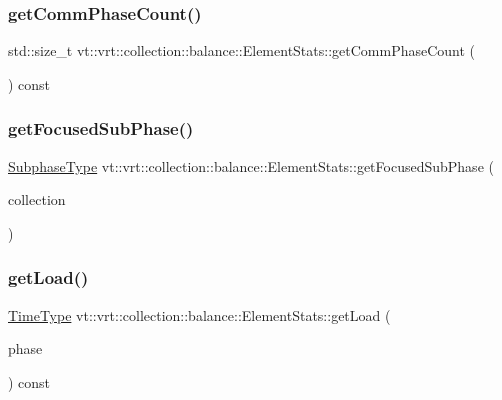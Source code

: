 \subsubsection{\texorpdfstring{get\+Comm\+Phase\+Count()}{getCommPhaseCount()}}
{\footnotesize\ttfamily std\+::size\+\_\+t vt\+::vrt\+::collection\+::balance\+::\+Element\+Stats\+::get\+Comm\+Phase\+Count (\begin{DoxyParamCaption}{ }\end{DoxyParamCaption}) const}

\mbox{\label{structvt_1_1vrt_1_1collection_1_1balance_1_1_element_stats_ac52b9e7f8ba66cc20e8130fa1e037e07}} 
\subsubsection{\texorpdfstring{get\+Focused\+Sub\+Phase()}{getFocusedSubPhase()}}
{\footnotesize\ttfamily \hyperlink{namespacevt_ae78cbfdf1e57470e33eedb074f2beeba}{Subphase\+Type} vt\+::vrt\+::collection\+::balance\+::\+Element\+Stats\+::get\+Focused\+Sub\+Phase (\begin{DoxyParamCaption}\item[{\hyperlink{namespacevt_a1b417dd5d684f045bb58a0ede70045ac}{Virtual\+Proxy\+Type}}]{collection }\end{DoxyParamCaption})\hspace{0.3cm}{\ttfamily [static]}}

\mbox{\label{structvt_1_1vrt_1_1collection_1_1balance_1_1_element_stats_aeb819ff1258eda6a7a1ccbd51b256731}} 
\subsubsection{\texorpdfstring{get\+Load()}{getLoad()}\hspace{0.1cm}{\footnotesize\ttfamily [1/2]}}
{\footnotesize\ttfamily \hyperlink{namespacevt_a876a9d0cd5a952859c72de8a46881442}{Time\+Type} vt\+::vrt\+::collection\+::balance\+::\+Element\+Stats\+::get\+Load (\begin{DoxyParamCaption}\item[{\hyperlink{namespacevt_a46ce6733d5cdbd735d561b7b4029f6d7}{Phase\+Type} const \&}]{phase }\end{DoxyParamCaption}) const}

